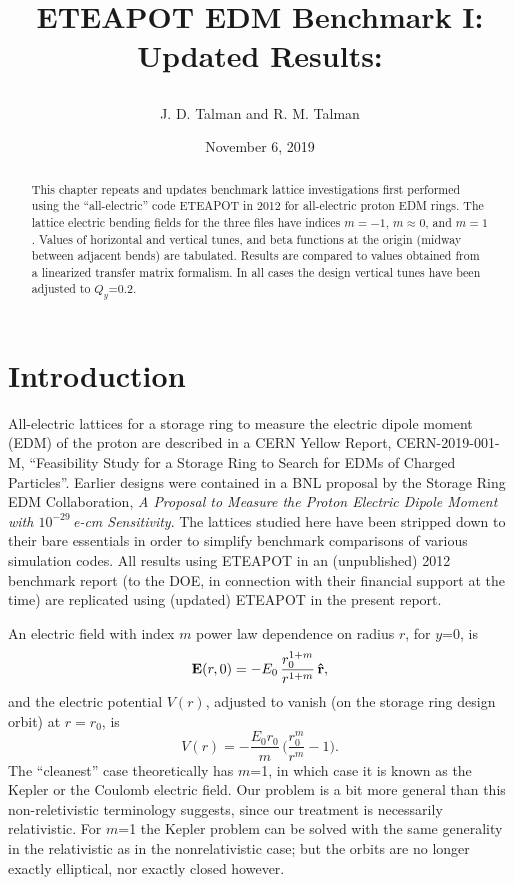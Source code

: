 \documentclass[12pt]{article}
\begin{document}
\date{November 6, 2019}

\title{
\centerline{}
\centerline{}
\centerline{}
ETEAPOT EDM Benchmark I: Updated Results:
}
\author{J. D. Talman and R. M. Talman
}

\maketitle


\begin{abstract}
This chapter repeats and updates benchmark lattice investigations first performed 
using the ``all-electric'' code ETEAPOT in 2012 for all-electric proton EDM rings. 
The lattice electric bending fields for the three files have indices $m=-1$, 
$m\approx0$, and $m=1$. Values of horizontal and vertical tunes, and beta 
functions at the origin (midway between adjacent bends) are tabulated. 
Results are compared to values obtained from a linearized transfer matrix 
formalism. In all cases the design vertical tunes have been adjusted to 
$Q_y$=0.2.
\end{abstract}
%

\clearpage

\section{Introduction}
All-electric lattices for a storage ring to measure the electric
dipole moment (EDM) of the proton are described in a CERN Yellow Report,
CERN-2019-001-M, ``Feasibility Study for a Storage Ring to Search for EDMs
of Charged Particles''. Earlier designs were contained in a BNL
proposal by the Storage Ring EDM Collaboration, \emph{A Proposal to Measure the
Proton Electric Dipole Moment with $10^{-29}\,$e-cm Sensitivity}\cite{pEDM}.
The lattices studied here have been stripped down to their bare essentials
in order to simplify benchmark comparisons of various simulation
codes. All results using ETEAPOT in an (unpublished) 2012 benchmark report
(to the DOE, in connection with their financial support at the time) 
are replicated using (updated) ETEAPOT in the present report. 

An electric field with index $m$ power law dependence on radius $r$,
for $y$=0, is
%
\begin{equation}
{\bf E}(r,0)
 = 
-E_0\,\frac{r_0^{1+ m }}{r^{1+ m }}\,{\bf\hat r},
\label{eq:WeakFoc.1m}
\end{equation}
%
and the electric potential $V(r)$, adjusted to vanish (on the storage ring 
design orbit) at $r=r_0$, is 
%
\begin{equation}
V(r)
 =
-\frac{E_0r_0}{ m }\,
\bigg(
\frac{r_0^m }{r^m }
 -
1
\bigg).
\label{eq:WeakFoc.2m}
\end{equation}
%
The ``cleanest'' case theoretically has $m$=1, in which case it is known
as the Kepler or the Coulomb electric field. Our problem is a
bit more general than this non-reletivistic terminology suggests, since our
treatment is necessarily relativistic. For $m$=1 the
Kepler problem can be solved with the same generality
in the relativistic as in the nonrelativistic case; but the
orbits are no longer exactly elliptical, nor exactly closed
however\cite{Munoz}.
\end{document}
